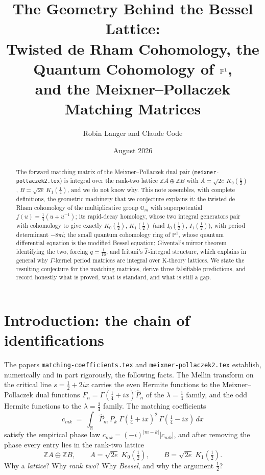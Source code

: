 \documentclass[11pt]{article}
\title{The Geometry Behind the Bessel Lattice:\\
Twisted de Rham Cohomology, the Quantum Cohomology of $\PP^1$,\\
and the Meixner--Pollaczek Matching Matrices}
\author{Robin Langer and Claude Code}
\date{August 2026}
\theoremstyle{definition}
\theoremstyle{remark}
\newcommand{\R}{\mathbb{R}}
\newcommand{\Z}{\mathbb{Z}}
\newcommand{\Gm}{\mathbb{G}_m}
\newcommand{\PP}{\mathbb{P}}
\newcommand{\G}{\Gamma}
\begin{document}
\maketitle

\begin{abstract}
The forward matching matrix of the Meixner--Pollaczek dual pair
(\texttt{meixner-pollaczek2.tex}) is integral over the rank-two
lattice $\Z A \oplus \Z B$ with $A = \sqrt{2e}\,K_0(\tfrac12)$,
$B = \sqrt{2e}\,K_1(\tfrac12)$, and we do not know why. This note
assembles, with complete definitions, the geometric machinery that
we conjecture explains it: the twisted de Rham cohomology of the
multiplicative group $\Gm$ with superpotential
$f(u) = \tfrac14(u + u^{-1})$; its rapid-decay homology, whose two
integral generators pair with cohomology to give exactly
$K_0(\tfrac12)$, $K_1(\tfrac12)$ (and $I_0(\tfrac12)$,
$I_1(\tfrac12)$), with period determinant $-8\pi i$; the small
quantum cohomology ring of $\PP^1$, whose quantum differential
equation is the modified Bessel equation; Givental's mirror theorem
identifying the two, forcing $q = \tfrac1{16}$; and Iritani's
$\widehat\G$-integral structure, which explains in general why
$\G$-kernel period matrices are integral over K-theory lattices. We
state the resulting conjecture for the matching matrices, derive
three falsifiable predictions, and record honestly what is proved,
what is standard, and what is still a gap.
\end{abstract}

\tableofcontents

\section{Introduction: the chain of identifications}

The papers \texttt{matching-coefficients.tex} and
\texttt{meixner-pollaczek2.tex} establish, numerically and in part
rigorously, the following facts. The Mellin transform on the
critical line $s = \tfrac12 + 2ix$ carries the even Hermite
functions to the Meixner--Pollaczek dual functions
$F_n = \G(\tfrac14+ix)\widehat P_n$ of the $\lambda = \tfrac14$
family, and the odd Hermite functions to the $\lambda = \tfrac34$
family. The matching coefficients
\[
  c_{mk} \;=\; \int_\R \widehat P_m\,\widehat P_k\;
  \G(\tfrac14+ix)^2\,\G(\tfrac14-ix)\,dx
\]
satisfy the empirical phase law $c_{mk} = (-i)^{|m-k|}|c_{mk}|$, and
after removing the phase every entry lies in the rank-two lattice
\begin{equation}\label{eq:lattice}
  \Z A \oplus \Z B, \qquad
  A = \sqrt{2e}\;K_0(\tfrac12), \qquad
  B = \sqrt{2e}\;K_1(\tfrac12).
\end{equation}
Why a \emph{lattice}? Why \emph{rank two}? Why \emph{Bessel}, and
why the argument $\tfrac12$?
\end{document}
